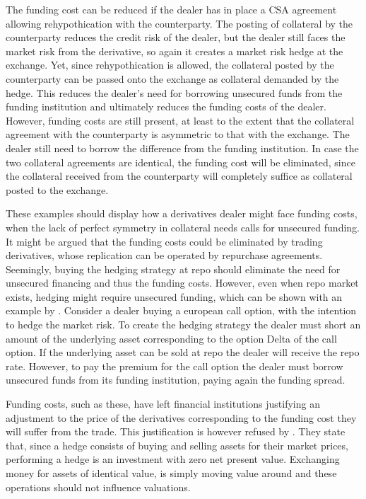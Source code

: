 \documentclass[../../../main.tex]{subfiles}
\begin{document}
        The funding cost can be reduced if the dealer has in place a CSA agreement allowing rehypothication with the counterparty.
        The posting of collateral by the counterparty reduces the credit risk of the dealer,
        but the dealer still faces the market risk from the derivative, 
        so again it creates a market risk hedge at the exchange.
        Yet, since rehypothication is allowed,
        the collateral posted by the counterparty can be passed onto the exchange as collateral demanded by the hedge.
        This reduces the dealer's need for borrowing unsecured funds from the funding institution 
        and ultimately reduces the funding costs of the dealer.
        However, funding costs are still present, 
        at least to the extent that the collateral agreement with the counterparty is asymmetric to that with the exchange.
        The dealer still need to borrow the difference from the funding institution.
        In case the two collateral agreements are identical, the funding cost will be eliminated, 
        since the collateral received from the counterparty will completely suffice as collateral posted to the exchange.

        These examples should display how a derivatives dealer might face funding costs,
        when the lack of perfect symmetry in collateral needs calls for unsecured funding.
        It might be argued that the funding costs could be eliminated by trading derivatives,
        whose replication can be operated by repurchase agreements. 
        Seemingly, buying the hedging strategy at repo should eliminate the need for unsecured financing
        and thus the funding costs. 
        However, even when repo market exists, hedging might require unsecured funding,
        which can be shown with an example by \cite{Castagna2012FVA}.
        Consider a dealer buying a european call option, with the intention to hedge the market risk.
        To create the hedging strategy the dealer must short an amount of the underlying asset corresponding to the option Delta of the call option.
        If the underlying asset can be sold at repo the dealer will receive the repo rate.
        However, to pay the premium for the call option the dealer must borrow unsecured funds from its funding institution,
        paying again the funding spread. 

        Funding costs, such as these, have left financial institutions justifying an adjustment to the price of the derivatives
        corresponding to the funding cost they will suffer from the trade.
        This justification is however refused by \cite{HullWhite2012FVA}.
        They state that, since a hedge consists of buying and selling assets for their market prices,
        performing a hedge is an investment with zero net present value.
        Exchanging money for assets of identical value,
        is simply moving value around and these operations should not influence valuations. 
\end{document}
